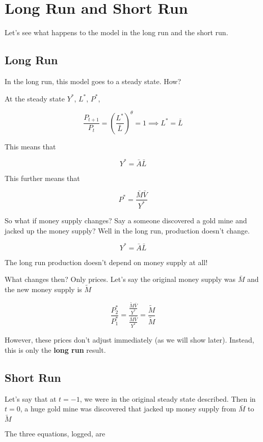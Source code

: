 \documentclass[11pt]{scrartcl}
\begin{document}
\setcounter{equation}{0}

\section{Long Run and Short Run}

Let's see what happens to the model in the long run and the short run.

\subsection{Long Run}

In the long run, this model goes to a steady state. How?

At the steady state $Y^*$, $L^*$, $P^*$, 

\[ \frac{P_{t+1}}{P_{t}} = \left(\frac{L^*}{\bar{L}}\right)^\theta = 1 \implies L^* = \bar{L} \]

This means that

\[Y^* = \bar{A} \bar{L}\]

This further means that

\[P^* = \frac{\bar{M} \bar{V}}{Y^*}\]

So what if money supply changes? Say a someone discovered a gold mine and jacked up the money supply? Well in the long run, production doesn't change.

\[Y^* = \bar{A}\bar{L} \]

The long run production doesn't depend on money supply at all!

What changes then? Only prices. Let's say the original money supply was $\bar{M}$ and the new money supply is $\tilde{M}$

\[ \frac{P^*_{2}}{P^*_{1}} = \frac{\frac{\tilde{M} \bar{V}}{Y^*}}{\frac{\bar{M} \bar{V}}{Y^*}} = \frac{\tilde{M}}{\tilde{M}} \]

However, these prices don't adjust immediately (as we will show later). Instead, this is only the \textbf{long run} result.

\subsection{Short Run}

Let's say that at $t=-1$, we were in the original steady state described. Then in $t=0$, a huge gold mine was discovered that jacked up money supply from $\bar{M}$ to $\tilde{M}$

The three equations, logged, are
\end{document}
